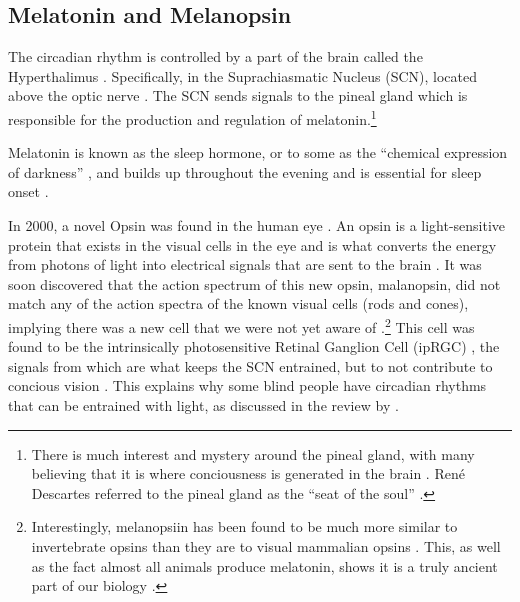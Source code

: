\subsection{Melatonin and Melanopsin}

The circadian rhythm is controlled by a part of the brain called the Hyperthalimus \citep{stephanCircadianRhythmsDrinking1972}. Specifically, in the Suprachiasmatic Nucleus (SCN), located above the optic nerve \citep{welshIndividualNeuronsDissociated1995}. The SCN sends signals to the pineal gland \citep{cassoneMelatoninRoleVertebrate1998, borjiginPINEALGLANDMELATONIN1999} which is responsible for the production and regulation of melatonin.\footnote{
There is much interest and mystery around the pineal gland, with many believing that it is where conciousness is generated in the brain \citep{bobMelatoninConsciousnessTraumatic2008}. Ren\'e Descartes referred to the pineal gland as the ``seat of the soul'' \citep{lokhorstDescartesPinealGland2020}.
}

Melatonin is known as the sleep hormone, or to some as the ``chemical expression of darkness'' \citep{reiterMelatoninChemicalExpression1991}, and builds up throughout the evening and is essential for sleep onset \citep{arendtImportanceRelevanceMelatonin2003}.

In 2000, a novel Opsin was found in the human eye \citep{provencioNovelHumanOpsin2000}. An opsin is a light-sensitive protein that exists in the visual cells in the eye and is what converts the energy from photons of light into electrical signals that are sent to the brain \citep{terakitaOpsins2005}. It was soon discovered that the action spectrum of this new opsin, malanopsin, did not match any of the action spectra of the known visual cells (rods and cones), implying there was a new cell that we were not yet aware of \citep{thapanActionSpectrumMelatonin2001}.\footnote{
Interestingly, melanopsiin has been found to be much more similar to invertebrate opsins than they are to visual mammalian opsins \citep{provencioMelanopsinOpsinMelanophores1998}. This, as well as the fact almost all animals produce melatonin, shows it is a truly ancient part of our biology \citep{daviesEvolutionFunctionMelanopsin2014}.
} 
This cell was found to be the intrinsically photosensitive Retinal Ganglion Cell (ipRGC) \citep{bersonPhototransductionRetinalGanglion2002}, the signals from which are what keeps the SCN entrained, but to not contribute to concious vision \citep{bersonPhototransductionGanglioncellPhotoreceptors2007}. This explains why some blind people have circadian rhythms that can be entrained with light, as discussed in the review by \citet{allenCircadianRhythmsBlind2019}.


